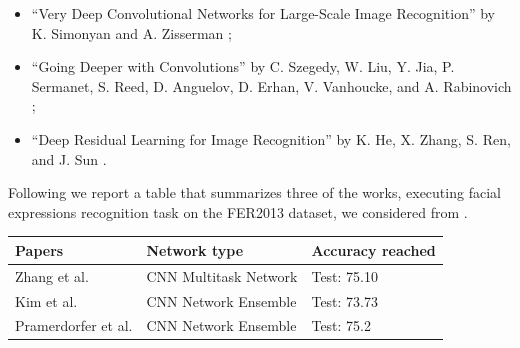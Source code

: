 \documentclass[10pt,twocolumn,letterpaper]{article}
\begin{document}
\begin{itemize}
   \item ``Very Deep Convolutional Networks
         for Large-Scale Image Recognition'' by K. Simonyan and A. Zisserman \cite{24};
   \item ``Going Deeper with Convolutions'' by C. Szegedy, W. Liu, Y. Jia, P. Sermanet, S. Reed, D. Anguelov, D. Erhan,
         V. Vanhoucke, and A. Rabinovich \cite{13};
   \item ``Deep Residual Learning for Image Recognition'' by K. He, X. Zhang, S. Ren, and J. Sun \cite{5}.
\end{itemize}
Following we report a table that summarizes three of the works, executing facial expressions
recognition task on the FER2013 dataset, we considered from \cite{paper}.

\begin{table}[h]
   \begin{center}
      \begin{tabular}{|C{2.2cm}|C{2.2cm}|C{1.6cm}|}
         \hline
         Papers                         & Network type          & Accuracy reached \\
         \hline\hline
         Zhang et al. \cite{Zhang}      & CNN Multitask Network & Test: 75.10      \\\hline
         Kim et al. \cite{Kim}          & CNN Network Ensemble  & Test: 73.73      \\\hline
         Pramerdorfer et al. \cite{147} & CNN Network Ensemble  & Test: 75.2       \\
         \hline
      \end{tabular}
   \end{center}
   \label{mytable}
\end{table}
\end{document}
